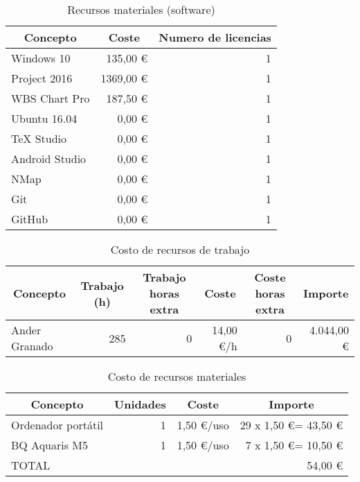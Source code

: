 \begin{table}[H]
	\centering
	\begin{tabular}{ |l|r|r| } 
		\hline
		\multicolumn{1}{|c|}{Concepto} & 
			\multicolumn{1}{|c|}{Coste} & 
				\multicolumn{1}{|c|}{Numero de licencias} \\
		\hline
		Windows 10 		& 135,00 \euro \cite{precio-win10} 		& 1 \\
		Project 2016 	& 1369,00 \euro \cite{precio-project} 	& 1 \\
		WBS Chart Pro 	& 187,50 \euro \cite{precio-wbs} 		& 1 \\
		Ubuntu 16.04 	& 0,00 \euro 							& 1 \\
		TeX Studio 		& 0,00 \euro							& 1 \\
		Android Studio 	& 0,00 \euro 							& 1 \\
		NMap 			& 0,00 \euro 							& 1 \\
		Git 			& 0,00 \euro 							& 1 \\
		GitHub 			& 0,00 \euro 							& 1 \\
		\hline
	\end{tabular}
	\caption{Recursos materiales (software)}
	\label{table:recursos-software}
\end{table}

\begin{table}[H]
	\centering
	\begin{tabular}{ |l|r|r|r|r|r| } 
		\hline
		\multicolumn{1}{|c|}{Concepto} & 
			\multicolumn{1}{|c|}{Trabajo (h)} & 
				\multicolumn{1}{|c|}{Trabajo horas extra} & 
					\multicolumn{1}{|c|}{Coste} & 
						\multicolumn{1}{|c|}{Coste horas extra} & 
							\multicolumn{1}{|c|}{Importe} \\
		\hline
		Ander Granado & 285 & 0 & 14,00 \euro/h & 0 & 4.044,00 \euro \\
		\hline
	\end{tabular}
	\caption{Costo de recursos de trabajo}
	\label{table:costo-recursos-trabajo}
\end{table}

\begin{table}[H]
	\centering
	\begin{tabular}{ |l|r|r|r| } 
		\hline
		\multicolumn{1}{|c|}{Concepto} & 
			\multicolumn{1}{|c|}{Unidades} & 
				\multicolumn{1}{|c|}{Coste} & 
					\multicolumn{1}{|c|}{Importe} \\
		\hline
		Ordenador portátil 	& 1 & 1,50 \euro/uso & 29 x 1,50 \euro \space= 43,50 \euro	\\
		BQ Aquaris M5 		& 1 & 1,50 \euro/uso & 7 x 1,50 \euro \space= 10,50 \euro	\\
		\hline
		\multicolumn{3}{|l}{TOTAL} & \multicolumn{1}{r|}{54,00 \euro} \\ 
		\hline
	\end{tabular}
	\caption{Costo de recursos materiales}
	\label{table:costo-recursos-materiales}
\end{table}

